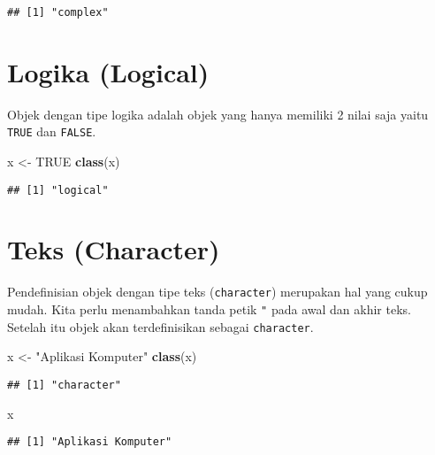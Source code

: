 \documentclass[
]{book}
\newenvironment{Shaded}{\begin{snugshade}}{\end{snugshade}}
\newcommand{\KeywordTok}[1]{\textcolor[rgb]{0.13,0.29,0.53}{\textbf{#1}}}
\newcommand{\NormalTok}[1]{#1}
\newcommand{\OtherTok}[1]{\textcolor[rgb]{0.56,0.35,0.01}{#1}}
\newcommand{\StringTok}[1]{\textcolor[rgb]{0.31,0.60,0.02}{#1}}
\begin{document}
\begin{verbatim}
## [1] "complex"
\end{verbatim}

\hypertarget{logical}{%
\section{Logika (Logical)}\label{logical}}

Objek dengan tipe logika adalah objek yang hanya memiliki 2 nilai saja yaitu \texttt{TRUE} dan \texttt{FALSE}.

\begin{Shaded}
\begin{Highlighting}[]
\NormalTok{x <-}\StringTok{ }\OtherTok{TRUE}
\KeywordTok{class}\NormalTok{(x)}
\end{Highlighting}
\end{Shaded}

\begin{verbatim}
## [1] "logical"
\end{verbatim}

\hypertarget{character}{%
\section{Teks (Character)}\label{character}}

Pendefinisian objek dengan tipe teks (\texttt{character}) merupakan hal yang cukup mudah. Kita perlu menambahkan tanda petik \texttt{"} pada awal dan akhir teks. Setelah itu objek akan terdefinisikan sebagai \texttt{character}.

\begin{Shaded}
\begin{Highlighting}[]
\NormalTok{x <-}\StringTok{ "Aplikasi Komputer"}
\KeywordTok{class}\NormalTok{(x)}
\end{Highlighting}
\end{Shaded}

\begin{verbatim}
## [1] "character"
\end{verbatim}

\begin{Shaded}
\begin{Highlighting}[]
\NormalTok{x}
\end{Highlighting}
\end{Shaded}

\begin{verbatim}
## [1] "Aplikasi Komputer"
\end{verbatim}
\end{document}

